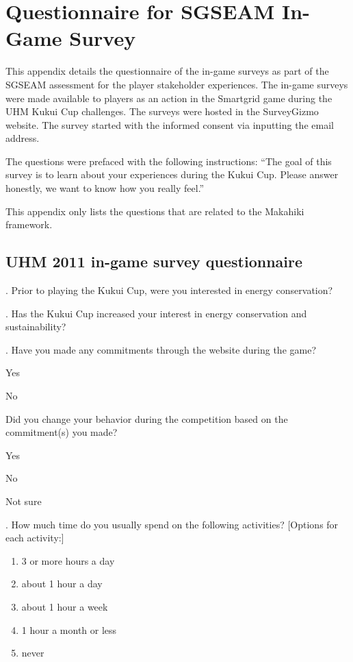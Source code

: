 \chapter{Questionnaire for SGSEAM In-Game Survey}
\label{app:in-game-questionnaire}

This appendix details the questionnaire of the in-game surveys as part of the SGSEAM assessment for the player stakeholder experiences. The in-game surveys were made available to players as an action in the Smartgrid game during the UHM Kukui Cup challenges. The surveys were hosted in the SurveyGizmo \cite{surveygizmo} website. The survey started with the informed consent via inputting the email address. 

The questions were prefaced with the following instructions: ``The goal of this survey is to learn about your experiences during the Kukui Cup. Please answer honestly, we want to know how you really feel.''

This appendix only lists the questions that are related to the Makahiki framework.

\section {UHM 2011 in-game survey questionnaire}
. Prior to playing the Kukui Cup, were you interested in energy conservation?

. Has the Kukui Cup increased your interest in energy conservation and sustainability?

. Have you made any commitments through the website during the game?
\begin{radiobutton}
	\item Yes
	\item No
\end{radiobutton}

\noindent
[If Yes] Did you change your behavior during the competition based on the commitment(s) you made?
\begin{radiobutton}
	\item Yes
	\item No
	\item Not sure
\end{radiobutton}

. How much time do you usually spend on the following activities?
[Options for each activity:]
\begin{enumerate}
	\item 3 or more hours a day
	\item about 1 hour a day
	\item about 1 hour a week
	\item 1 hour a month or less
	\item never
\end{enumerate}

